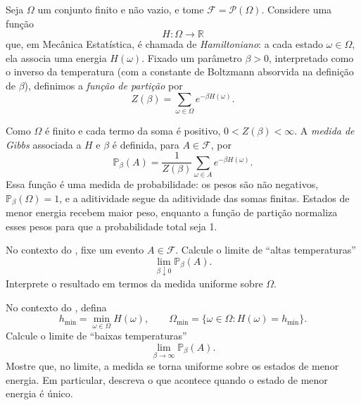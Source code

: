 
\begin{example}\label{ex:gibbs-measure}
  Seja \(\Omega\) um conjunto finito e não vazio, e tome
  \(\mathcal{F} = \mathscr{P}(\Omega)\). Considere uma função
  \[
    H : \Omega \longrightarrow \mathbb{R}
  \]
  que, em Mecânica Estatística, é chamada de \emph{Hamiltoniano}: a cada
  estado \(\omega \in \Omega\), ela associa uma energia \(H(\omega)\).
  Fixado um parâmetro \(\beta > 0\), interpretado como o inverso da
  temperatura (com a constante de Boltzmann absorvida na definição de
  \(\beta\)), definimos a \emph{função de partição} por
  \[
    Z(\beta) = \sum_{\omega \in \Omega} e^{-\beta H(\omega)}.
  \]

  Como \(\Omega\) é finito e cada termo da soma é positivo,
  \(0 < Z(\beta) < \infty\). A \emph{medida de Gibbs} associada a \(H\) e
  \(\beta\) é definida, para \(A \in \mathcal{F}\), por
  \[
    \mathbb{P}_\beta(A)
    = \frac{1}{Z(\beta)}
      \sum_{\omega \in A} e^{-\beta H(\omega)}.
  \]
  Essa função é uma medida de probabilidade: os pesos são não negativos,
  \(\mathbb{P}_\beta(\Omega)=1\), e a aditividade segue da aditividade das
  somas finitas. Estados de menor energia recebem maior peso, enquanto a
  função de partição normaliza esses pesos para que a probabilidade total
  seja 1.
\end{example}

\begin{exercise}\label{exercise:gibbs-high-temperature}
  No contexto do , fixe um evento \(A \in \mathcal{F}\).
  Calcule o limite de ``altas temperaturas''
  \[
    \lim_{\beta \downarrow 0} \mathbb{P}_\beta(A).
  \]
  Interprete o resultado em termos da medida uniforme sobre \(\Omega\).
\end{exercise}

\begin{exercise}\label{exercise:gibbs-low-temperature}
  No contexto do , defina
  \[
    h_{\min} = \min_{\omega \in \Omega} H(\omega),
    \qquad
    \Omega_{\min} = \{\omega \in \Omega : H(\omega) = h_{\min}\}.
  \]
  Calcule o limite de ``baixas temperaturas''
  \[
    \lim_{\beta \to \infty} \mathbb{P}_\beta(A).
  \]
  Mostre que, no limite, a medida se torna uniforme sobre os estados de menor
  energia. Em particular, descreva o que acontece quando o estado de menor
  energia é único.
\end{exercise}
